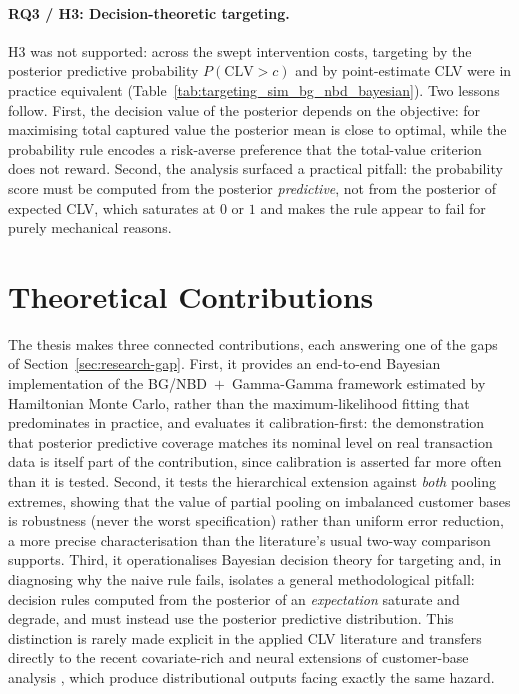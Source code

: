 \paragraph{RQ3 / H3: Decision-theoretic targeting.}
H3 was not supported: across the swept intervention costs, targeting by the posterior predictive probability $P(\text{CLV} > c)$ and by point-estimate CLV were in practice equivalent (Table~\ref{tab:targeting_sim_bg_nbd_bayesian}). Two lessons follow. First, the decision value of the posterior depends on the objective: for maximising total captured value the posterior mean is close to optimal, while the probability rule encodes a risk-averse preference that the total-value criterion does not reward. Second, the analysis surfaced a practical pitfall: the probability score must be computed from the posterior \emph{predictive}, not from the posterior of expected CLV, which saturates at $0$ or $1$ and makes the rule appear to fail for purely mechanical reasons.

\section{Theoretical Contributions}
\label{sec:contributions}

The thesis makes three connected contributions, each answering one of the gaps of Section~\ref{sec:research-gap}. First, it provides an end-to-end Bayesian implementation of the BG/NBD~$+$~Gamma-Gamma framework estimated by Hamiltonian Monte Carlo, rather than the maximum-likelihood fitting that predominates in practice, and evaluates it calibration-first: the demonstration that posterior predictive coverage matches its nominal level on real transaction data is itself part of the contribution, since calibration is asserted far more often than it is tested. Second, it tests the hierarchical extension against \emph{both} pooling extremes, showing that the value of partial pooling on imbalanced customer bases is robustness (never the worst specification) rather than uniform error reduction, a more precise characterisation than the literature's usual two-way comparison supports. Third, it operationalises Bayesian decision theory for targeting and, in diagnosing why the naive rule fails, isolates a general methodological pitfall: decision rules computed from the posterior of an \emph{expectation} saturate and degrade, and must instead use the posterior predictive distribution. This distinction is rarely made explicit in the applied CLV literature and transfers directly to the recent covariate-rich and neural extensions of customer-base analysis \parencite{bachmann2021, valendin2022}, which produce distributional outputs facing exactly the same hazard.


